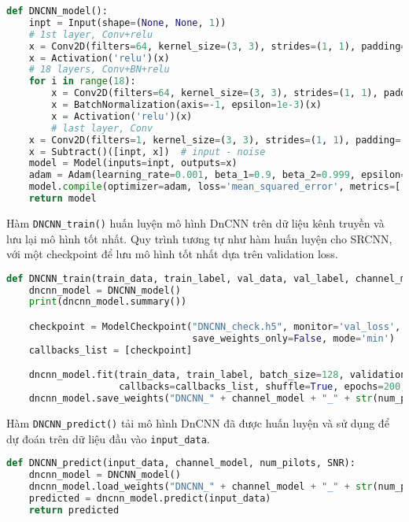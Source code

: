 \begin{lstlisting}[language=Python]
def DNCNN_model():
    inpt = Input(shape=(None, None, 1))
    # 1st layer, Conv+relu
    x = Conv2D(filters=64, kernel_size=(3, 3), strides=(1, 1), padding='same')(inpt)
    x = Activation('relu')(x)
    # 18 layers, Conv+BN+relu
    for i in range(18):
        x = Conv2D(filters=64, kernel_size=(3, 3), strides=(1, 1), padding='same')(x)
        x = BatchNormalization(axis=-1, epsilon=1e-3)(x)
        x = Activation('relu')(x)
        # last layer, Conv
    x = Conv2D(filters=1, kernel_size=(3, 3), strides=(1, 1), padding='same')(x)
    x = Subtract()([inpt, x])  # input - noise
    model = Model(inputs=inpt, outputs=x)
    adam = Adam(learning_rate=0.001, beta_1=0.9, beta_2=0.999, epsilon=1e-8)
    model.compile(optimizer=adam, loss='mean_squared_error', metrics=['mean_squared_error'])
    return model
\end{lstlisting}

Hàm \verb|DNCNN_train()| huấn luyện mô hình DnCNN trên dữ liệu kênh truyền và lưu lại mô hình tốt nhất. 
Quy trình tương tự như hàm huấn luyện cho SRCNN, với một checkpoint để lưu mô hình tốt nhất dựa trên validation loss.

\begin{lstlisting}[language=Python]
def DNCNN_train(train_data, train_label, val_data, val_label, channel_model, num_pilots, SNR):
    dncnn_model = DNCNN_model()
    print(dncnn_model.summary())

    checkpoint = ModelCheckpoint("DNCNN_check.h5", monitor='val_loss', verbose=1, save_best_only=True,
                                 save_weights_only=False, mode='min')
    callbacks_list = [checkpoint]

    dncnn_model.fit(train_data, train_label, batch_size=128, validation_data=(val_data, val_label),
                    callbacks=callbacks_list, shuffle=True, epochs=200, verbose=0)
    dncnn_model.save_weights("DNCNN_" + channel_model + "_" + str(num_pilots) + "_" + str(SNR) + ".h5")
\end{lstlisting}

Hàm \verb|DNCNN_predict()| tải mô hình DnCNN đã được huấn luyện và sử dụng để dự đoán trên dữ liệu đầu vào \verb|input_data|.

\begin{lstlisting}[language=Python]
def DNCNN_predict(input_data, channel_model, num_pilots, SNR):
    dncnn_model = DNCNN_model()
    dncnn_model.load_weights("DNCNN_" + channel_model + "_" + str(num_pilots) + "_" + str(SNR) + ".h5")
    predicted = dncnn_model.predict(input_data)
    return predicted
\end{lstlisting}